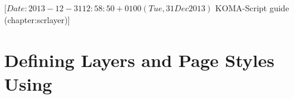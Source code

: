 %
%
%
%
%
%
%
%
% 
%
%
%
%

                 [$Date: 2013-12-31 12:58:50 +0100 (Tue, 31 Dec 2013) $
                  KOMA-Script guide (chapter:scrlayer)]



\chapter[{Defining Layers and Page Styles Using \Package{scrlayer}}]%
{Defining Layers and Page Styles Using %
}


